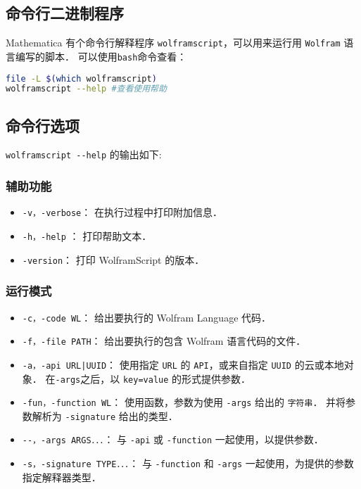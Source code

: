 
\begin{issues}
\issueDraft
\issueTODO
\end{issues}

\subsection{命令行二进制程序}

Mathematica 有个命令行解释程序 \verb`wolframscript`，可以用来运行用 \verb`Wolfram` 语言编写的脚本．
可以使用\verb`bash`命令查看：
\begin{lstlisting}[language=bash]
file -L $(which wolframscript)
wolframscript --help #查看使用帮助
\end{lstlisting}

\subsection{命令行选项} 

\verb`wolframscript --help` 的输出如下:

\subsubsection{辅助功能} 
\begin{itemize}
\item \verb`-v，-verbose`： 在执行过程中打印附加信息．
\item \verb`-h，-help` ： 打印帮助文本．
\item \verb`-version`： 打印 WolframScript 的版本．
\end{itemize}

\subsubsection{运行模式} 
\begin{itemize}
\item \verb`-c，-code WL`： 给出要执行的 Wolfram Language 代码．
\item \verb`-f，-file PATH`： 给出要执行的包含 Wolfram 语言代码的文件．
\item \verb`-a，-api URL|UUID`： 使用指定 \verb`URL` 的 \verb`API`，或来自指定 \verb`UUID` 的云或本地对象． 
在\verb`-args`之后，以 \verb`key=value` 的形式提供参数．
\item \verb`-fun，-function WL`： 使用函数，参数为使用 \verb`-args` 给出的 \verb`字符串`．
并将参数解析为 \verb`-signature` 给出的类型．
\item \verb`--，-args ARGS．．．`： 与 \verb`-api` 或 \verb`-function` 一起使用，以提供参数．
\item \verb`-s，-signature TYPE．．．`： 与 \verb`-function` 和 \verb`-args` 一起使用，为提供的参数指定解释器类型．
\end{itemize}

